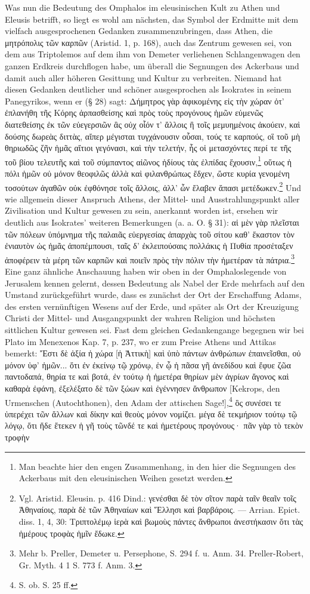 \documentclass[a4paper, 11pt, oneside]{article}
\begin{document}
Was nun die Bedeutung des Omphalos im eleusinischen Kult zu Athen und Eleusis betrifft, so liegt es wohl am nächsten, das Symbol der Erdmitte mit dem vielfach ausgesprochenen Gedanken zusammenzubringen, dass Athen, die μητρόπολις τῶν καρπῶν (Aristid. 1, p. 168), auch das Zentrum gewesen sei, von dem aus Triptolemos auf dem ihm von Demeter verliehenen Schlangenwagen den ganzen Erdkreis durchflogen habe, um überall die Segnungen des Ackerbaus und damit auch aller höheren Gesittung und Kultur zu verbreiten. Niemand hat diesen Gedanken deutlicher und schöner ausgesprochen als Isokrates in seinem Panegyrikos, wenn er (§ 28) sagt: Δήμητρος γὰρ ἀφικομένης εἰς τὴν χώραν ὁτ' ἐπλανήθη τῆς Κόρης ἁρπασθείσης καὶ πρὸς τοὺς προγόνους ἡμῶν εὐμενῶς διατεθείσης ἐκ τῶν εὐεγερσιῶν ἃς οὐχ οἷόν τ' ἄλλοις ἢ τοῖς μεμυημένοις ἀκούειν, καὶ δούσης δωρεὰς διττὰς, αἴπερ μέγισται τυγχάνουσιν οὗσαι, τούς τε καρπούς, οἳ τοῦ μὴ θηριωδῶς ζῆν ἡμᾶς αἴτιοι γεγόνασι, καὶ τὴν τελετήν, ἧς οἱ μετασχόντες περί τε τῆς τοῦ βίου τελευτῆς καὶ τοῦ σύμπαντος αἰῶνος ἡδίους τὰς ἐλπίδας ἔχουσιν,\footnote{Man beachte hier den engen Zusammenhang, in den hier die Segnungen des Ackerbaus mit den eleusinischen Weihen gesetzt werden.} οὕτως ἡ πόλι ἡμῶν οὐ μόνον θεοφιλῶς ἀλλὰ καὶ φιλανθρώπως ἔδχεν, ὥστε κυρία γενομένη τοσούτων ἀγαθῶν οὐκ ἐφθόνησε τοῖς ἄλλοις, ἀλλ' ὧν ἔλαβεν ἅπασι μετέδωκεν.\footnote{Vgl. Aristid. Eleusin. p. 416 Dind.: γενέσθαι δὲ τὸν σῖτον παρὰ ταῖν θεαῖν τοῖς Ἀθηναίοις, παρὰ δὲ τῶν Ἀθηναίων καὶ Ἕλλησι καὶ βαρβάροις. --- Arrian. Epict. diss. 1, 4, 30: Τριπτολέμῳ ἱερὰ καὶ βωμοὺς πάντες ἄνθρωποι ἀνεστήκασιν ὅτι τὰς ἡμέρους τροφὰς ἡμῖν ἔδωκε.} Und wie allgemein dieser Anspruch Athens, der Mittel- und Ausstrahlungspunkt aller Zivilisation und Kultur gewesen zu sein, anerkannt worden ist, ersehen wir deutlich aus Isokrates' weiteren Bemerkungen (a. a. O. § 31): αἱ μὲν γὰρ πλεῖσται τῶν πόλεων ὑπόμνημα τῆς παλαιᾶς εὐεργεσίας ἀπαρχὰς τοῦ σίτου καθ' ἕκαστον τὸν ἐνιαυτὸν ὡς ἡμᾶς ἀποπέμπουσι, ταῖς δ' ἐκλειπούσαις πολλάκις ἡ Πυθία προσέταξεν ἀποφέρειν τὰ μέρη τῶν καρπῶν καὶ ποιεῖν πρὸς τὴν πόλιν τὴν ἡμετέραν τὰ πάτρια.\footnote{Mehr b. Preller, Demeter u. Persephone, S. 294 f. u. Anm. 34. Preller-Robert, Gr. Myth. 4 1 S. 773 f. Anm. 3.} Eine ganz ähnliche Anschauung haben wir oben in der Omphaloslegende von Jerusalem kennen gelernt, dessen Bedeutung als Nabel der Erde mehrfach auf den Umstand zurückgeführt wurde, dass es zunächst der Ort der Erschaffung Adams, des ersten vernünftigen Wesens auf der Erde, und später als Ort der Kreuzigung Christi der Mittel- und Ausgangspunkt der wahren Religion und höchsten sittlichen Kultur gewesen sei. Fast dem gleichen Gedankengange begegnen wir bei Plato im Menexenos Kap. 7, p. 237, wo er zum Preise Athens und Attikas bemerkt: Ἔστι δὲ ἀξία ἡ χώρα [ἡ Ἀττικὴ] καὶ ὑπὸ πάντων ἀνθρώπων ἐπαινεῖσθαι, οὐ μόνον ὑφ' ἡμῶν... ὅτι ἐν ἐκείνῳ τῷ χρόνῳ, ἐν ᾧ ἡ πᾶσα γῆ ἀνεδίδου καὶ ἔφυε ζῶα παντοδαπά, θηρία τε καὶ βοτά, ἐν τούτῳ ἡ ἡμετέρα θηρίων μὲν ἀγρίων ἄγονος καὶ καθαρὰ ἐφάνη, ἐξελέξατο δὲ τῶν ξώων καὶ ἐγέννησεν ἄνθρωπον [Kekrops, den Urmenschen (Autochthonen), den Adam der attischen Sage!],\footnote{S. ob. S. 25 ff.} ὃς συνέσει τε ὑπερέχει τῶν ἄλλων καὶ δίκην καὶ θεοὺς μόνον νομίζει. μέγα δὲ τεκμήριον τούτῳ τῷ λόγῳ, ὅτι ἥδε ἔτεκεν ἡ γῆ τοὺς τῶνδέ τε καὶ ἡμετέρους προγόνους· πᾶν γὰρ τὸ τεκὸν τροφὴν 
\end{document}
